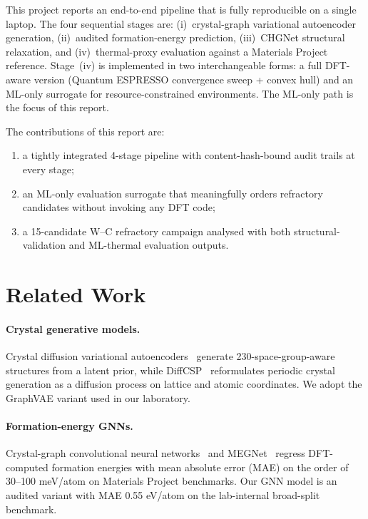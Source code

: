 \documentclass[11pt,a4paper]{article}
\begin{document}
This project reports an end-to-end pipeline that is fully reproducible
on a single laptop. The four sequential stages are: (i)~crystal-graph
variational autoencoder generation, (ii)~audited formation-energy
prediction, (iii)~CHGNet structural relaxation, and (iv)~thermal-proxy
evaluation against a Materials Project reference. Stage~(iv) is
implemented in two interchangeable forms: a full DFT-aware version
(Quantum ESPRESSO convergence sweep + convex hull) and an ML-only
surrogate for resource-constrained environments. The ML-only path is
the focus of this report.

The contributions of this report are:
\begin{enumerate}[noitemsep]
  \item a tightly integrated 4-stage pipeline with content-hash-bound
        audit trails at every stage;
  \item an ML-only evaluation surrogate that meaningfully orders
        refractory candidates without invoking any DFT code;
  \item a 15-candidate W--C refractory campaign analysed with both
        structural-validation and ML-thermal evaluation outputs.
\end{enumerate}

\section{Related Work}
\label{sec:related}

\paragraph{Crystal generative models.}
Crystal diffusion variational autoencoders~\cite{xie2021crystaldiff}
generate 230-space-group-aware structures from a latent prior, while
DiffCSP~\cite{jiao2024diffcsp} reformulates periodic crystal generation
as a diffusion process on lattice and atomic coordinates. We adopt the
GraphVAE variant used in our laboratory.

\paragraph{Formation-energy GNNs.}
Crystal-graph convolutional neural networks~\cite{xie2018crystalgraph}
and MEGNet~\cite{chen2019megnet} regress DFT-computed formation
energies with mean absolute error (MAE) on the order of 30--100 meV/atom
on Materials Project benchmarks. Our GNN model is an audited variant
with MAE 0.55 eV/atom on the lab-internal broad-split benchmark.
\end{document}
